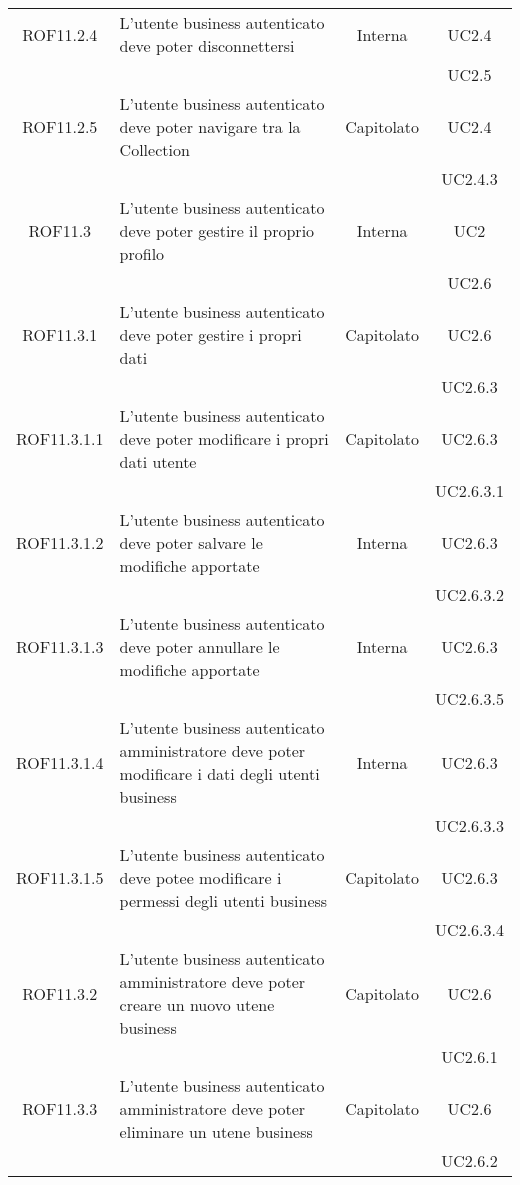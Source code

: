\begin{longtable}{|c|p{6cm}|c|c|}
\midrule
ROF11.2.4
& L'utente business autenticato deve poter disconnettersi 
& Interna
& UC2.4\\
& & & UC2.5
\\

\midrule
ROF11.2.5
& L'utente business autenticato deve poter navigare tra la Collection
& Capitolato
& UC2.4\\
& & & UC2.4.3\\

\midrule
ROF11.3
& L'utente business autenticato deve poter gestire il proprio profilo
& Interna
& UC2\\
& & & UC2.6
\\

\midrule
ROF11.3.1
& L'utente business autenticato deve poter gestire i propri dati
& Capitolato
& UC2.6\\
& & & UC2.6.3
\\

\midrule
ROF11.3.1.1
& L'utente business autenticato deve poter modificare i propri dati utente
& Capitolato
& UC2.6.3\\
& & & UC2.6.3.1
\\

\midrule
ROF11.3.1.2
& L'utente business autenticato deve poter  salvare le modifiche apportate
& Interna
& UC2.6.3\\
& & & UC2.6.3.2
\\

\midrule
ROF11.3.1.3
& L'utente business autenticato deve poter annullare le modifiche apportate
& Interna
& UC2.6.3\\
& & & UC2.6.3.5
\\

\midrule
ROF11.3.1.4
& L'utente business autenticato amministratore deve poter modificare i dati degli utenti business
& Interna
& UC2.6.3\\
& & & UC2.6.3.3
\\

\midrule
ROF11.3.1.5
& L'utente business autenticato deve potee modificare i permessi degli utenti business
& Capitolato
& UC2.6.3\\
& & & UC2.6.3.4
\\

\midrule
ROF11.3.2
& L'utente business autenticato amministratore deve poter creare un nuovo utene business
& Capitolato
& UC2.6\\
& & & UC2.6.1
\\

\midrule
ROF11.3.3
& L'utente business autenticato amministratore deve poter eliminare un utene business
& Capitolato
& UC2.6\\
& & & UC2.6.2
\\


\end{longtable}
